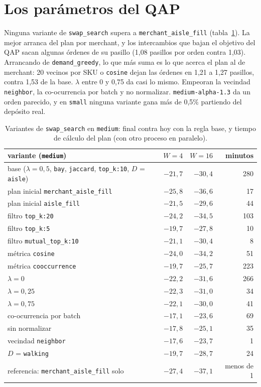 \documentclass[11pt,a4paper,oneside]{report}
\newcommand{\code}[1]{\texttt{\small #1}}
\begin{document}
\section{Los parámetros del QAP}

Ninguna variante de \code{swap\_search} supera a \code{merchant\_aisle\_fill}
(tabla~\ref{tab:qap}). La mejor arranca del plan por merchant, y los intercambios que bajan el
objetivo del QAP sacan algunas órdenes de su pasillo (1,08 pasillos por orden contra 1,03).
Arrancando de \code{demand\_greedy}, lo que más suma es lo que acerca el plan al de merchant:
20 vecinos por SKU o \code{cosine} dejan las órdenes en 1,21 a 1,27 pasillos, contra 1,53 de la
base. $\lambda$ entre 0 y 0,75 da casi lo mismo. Empeoran la vecindad \code{neighbor}, la
co-ocurrencia por batch y no normalizar. \code{medium-alpha-1.3} da un orden parecido, y en
\code{small} ninguna variante gana más de 0,5\% partiendo del depósito real.

\begin{table}[ht]
\centering\small
\begin{tabular}{@{}lrrr@{}}
\toprule
variante (\code{medium}) & $W = 4$ & $W = 16$ & minutos \\
\midrule
base ($\lambda = 0{,}5$, \code{bay}, \code{jaccard}, \code{top\_k:10}, $D$ = \code{aisle}) & $-21{,}7$ & $-30{,}4$ & 280 \\
plan inicial \code{merchant\_aisle\_fill} & $-25{,}8$ & $-36{,}6$ & 17 \\
plan inicial \code{aisle\_fill} & $-21{,}5$ & $-29{,}6$ & 44 \\
filtro \code{top\_k:20} & $-24{,}2$ & $-34{,}5$ & 103 \\
filtro \code{top\_k:5} & $-19{,}7$ & $-27{,}8$ & 10 \\
filtro \code{mutual\_top\_k:10} & $-21{,}1$ & $-30{,}4$ & 8 \\
métrica \code{cosine} & $-24{,}0$ & $-34{,}2$ & 51 \\
métrica \code{cooccurrence} & $-19{,}7$ & $-25{,}7$ & 223 \\
$\lambda = 0$ & $-22{,}2$ & $-31{,}6$ & 266 \\
$\lambda = 0{,}25$ & $-22{,}3$ & $-31{,}0$ & 34 \\
$\lambda = 0{,}75$ & $-22{,}1$ & $-30{,}0$ & 41 \\
co-ocurrencia por batch & $-17{,}1$ & $-23{,}6$ & 69 \\
sin normalizar & $-17{,}8$ & $-25{,}1$ & 35 \\
vecindad \code{neighbor} & $-17{,}6$ & $-23{,}7$ & 1 \\
$D$ = \code{walking} & $-19{,}7$ & $-28{,}7$ & 24 \\
\midrule
referencia: \code{merchant\_aisle\_fill} solo & $-27{,}4$ & $-37{,}1$ & menos de 1 \\
\bottomrule
\end{tabular}
\caption{Variantes de \code{swap\_search} en \code{medium}: final contra hoy con la regla base,
y tiempo de cálculo del plan (con otro proceso en paralelo).}
\label{tab:qap}
\end{table}
\end{document}
